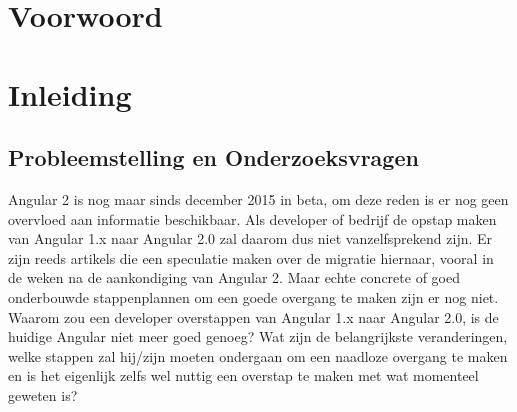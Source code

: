 \documentclass[pdftex,a4paper,12pt,twoside]{report}
\begin{document}
\begin{abstract}
\end{abstract}

\chapter*{Voorwoord}
\label{ch:voorwoord}


\tableofcontents



\chapter{Inleiding}
\label{ch:inleiding}

\section{Probleemstelling en Onderzoeksvragen}
\label{sec:onderzoeksvragen}

Angular 2 is nog maar sinds december 2015 in beta, om deze reden is er nog geen overvloed aan informatie beschikbaar. Als developer of bedrijf de opstap maken van Angular 1.x naar Angular 2.0 zal daarom dus niet vanzelfsprekend zijn. Er zijn reeds artikels die een speculatie maken over de migratie hiernaar, vooral in de weken na de aankondiging van Angular 2. Maar echte concrete of goed onderbouwde stappenplannen om een goede overgang te maken zijn er nog niet. Waarom zou een developer overstappen van Angular 1.x naar Angular 2.0, is de huidige Angular niet meer goed genoeg? Wat zijn de belangrijkste veranderingen, welke stappen zal hij/zijn moeten ondergaan om een naadloze overgang te maken en is het eigenlijk zelfs wel nuttig een overstap te maken met wat momenteel geweten is?
\end{document}
